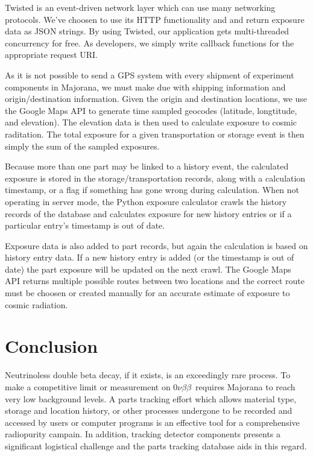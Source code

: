 \documentclass[journal]{IEEEtran}
\def\znbb{0$\nu\beta\beta$}
\begin{document}
Twisted is an event-driven network layer which can use many networking protocols. We've 
choosen to use its HTTP functionality and and return exposure data as JSON strings. By
using Twisted, our application gets multi-threaded concurrency for free. As developers,
we simply write callback functions for the appropriate request URI.

As it is not possible to send a GPS system with every shipment of experiment components
in Majorana, we must make due with shipping information and origin/destination information.
Given the origin and destination locations, we use the Google Maps API to generate time
sampled geocodes (latitude, longtitude, and elevation). The elevation data is then used
to calculate exposure to cosmic raditation. The total exposure for a given
transportation or storage event is then simply the sum of the sampled exposures.

Because more than one part may be linked to a history event, the calculated exposure is
stored in the storage/transportation records, along with a calculation timestamp, or a flag
if something has gone wrong during calculation. When not operating in server mode, the Python
exposure calculator crawls the history records of the database and calculates exposure for
new history entries or if a particular entry's timestamp is out of date. 

Exposure data is also added to part records, but again the calculation is based on history
entry data. If a new history entry is added (or the timestamp is out of date) the part
exposure will be updated on the next crawl. The Google Maps API returns multiple possible
routes between two locations and the correct route must be choosen or created
manually for an accurate estimate of exposure to cosmic radiation.

\section{Conclusion}

Neutrinoless double beta decay, if it exists, is an exceedingly rare process.
To make a competitive limit or measurement on \znbb\ requires Majorana to reach
very low background levels. A parts tracking effort which allows material type,
storage and location history, or other processes undergone to be recorded and
accessed by users or computer programs is an effective tool for a comprehensive
radiopurity campain. In addition, tracking detector components presents a significant
logistical challenge and the parts tracking database aids in this regard.
\end{document}
